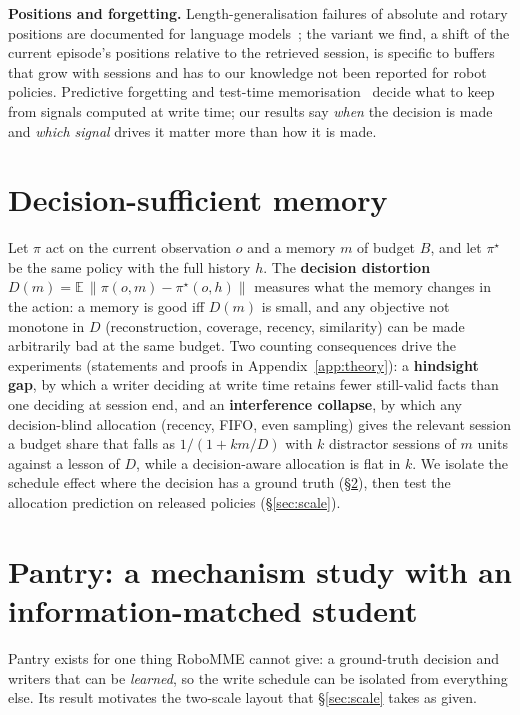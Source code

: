 \documentclass{article}
\begin{document}
\textbf{Positions and forgetting.} Length-generalisation failures of absolute and rotary positions are documented for language models~\cite{alibi,lengthgen}; the variant we find, a shift of the current episode's positions relative to the retrieved session, is specific to buffers that grow with sessions and has to our knowledge not been reported for robot policies. Predictive forgetting and test-time memorisation~\cite{titans} decide what to keep from signals computed at write time; our results say \emph{when} the decision is made and \emph{which signal} drives it matter more than how it is made.

\section{Decision-sufficient memory}
\label{sec:theory}

Let $\pi$ act on the current observation $o$ and a memory $m$ of budget $B$, and let $\pi^\star$ be the same policy with the full history $h$. The \textbf{decision distortion} $D(m)=\mathbb{E}\,\|\pi(o,m)-\pi^\star(o,h)\|$ measures what the memory changes in the action: a memory is good iff $D(m)$ is small, and any objective not monotone in $D$ (reconstruction, coverage, recency, similarity) can be made arbitrarily bad at the same budget. Two counting consequences drive the experiments (statements and proofs in Appendix~\ref{app:theory}): a \textbf{hindsight gap}, by which a writer deciding at write time retains fewer still-valid facts than one deciding at session end, and an \textbf{interference collapse}, by which any decision-blind allocation (recency, FIFO, even sampling) gives the relevant session a budget share that falls as $1/(1+km/D)$ with $k$ distractor sessions of $m$ units against a lesson of $D$, while a decision-aware allocation is flat in $k$. We isolate the schedule effect where the decision has a ground truth (\S\ref{sec:pantry}), then test the allocation prediction on released policies (\S\ref{sec:scale}).

\section{Pantry: a mechanism study with an information-matched student}
\label{sec:pantry}

Pantry exists for one thing RoboMME cannot give: a ground-truth decision and writers that can be \emph{learned}, so the write schedule can be isolated from everything else. Its result motivates the two-scale layout that \S\ref{sec:scale} takes as given.
\end{document}
